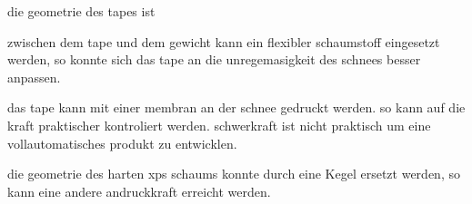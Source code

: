 die geometrie des tapes ist

zwischen dem tape und dem gewicht kann ein flexibler schaumstoff eingesetzt werden, so konnte sich das tape an die unregemasigkeit des schnees besser anpassen.

das tape kann mit einer membran an der schnee gedruckt werden. so kann auf die kraft praktischer kontroliert werden. schwerkraft ist nicht praktisch um eine vollautomatisches produkt zu entwicklen.

die geometrie des harten xps schaums konnte durch eine Kegel ersetzt werden, so kann eine andere andruckkraft erreicht werden.
